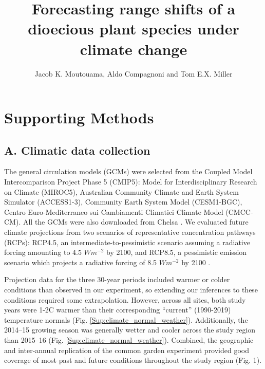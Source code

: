 \documentclass[9pt,twoside,lineno]{pnas-new}
\title{Forecasting range shifts of a dioecious plant species under climate change}
\author{Jacob K. Moutouama, Aldo Compagnoni and Tom E.X. Miller}
\begin{document}

\maketitle

\SItext


\section*{Supporting Methods}

\subsection*{A. Climatic data collection}
The general circulation models (GCMs) were selected from the Coupled Model Intercomparison Project Phase 5 (CMIP5): Model for Interdisciplinary Research on Climate (MIROC5), Australian Community Climate and Earth System Simulator (ACCESS1-3), Community Earth System Model (CESM1-BGC), Centro Euro-Mediterraneo sui Cambiamenti Climatici Climate Model (CMCC-CM).
All the GCMs were also downloaded from Chelsa \citep{sanderson2015representative}.
We evaluated future climate projections from two scenarios of representative concentration pathways (RCPs): RCP4.5, an intermediate-to-pessimistic scenario assuming a radiative forcing amounting to 4.5 $W m^{-2}$ by 2100, and RCP8.5, a pessimistic emission scenario which projects a radiative forcing of 8.5 $W m^{-2}$ by 2100 \citep{thomson2011rcp4, schwalm2020rcp8}. 

Projection data for the three 30-year periods included warmer or colder conditions than observed in our experiment, so extending our inferences to these conditions required some extrapolation. 
However, across all sites, both study years were 1-2\degree C warmer than their corresponding ``current'' (1990-2019) temperature normals (Fig. \ref{Sup:climate_normal_weather}). 
Additionally, the 2014--15 growing season was generally wetter and cooler across the study region than 2015--16 (Fig. \ref{Sup:climate_normal_weather}). 
Combined, the geographic and inter-annual replication of the common garden experiment provided good coverage of most past and future conditions throughout the study region (Fig. 1). 
\end{document}
